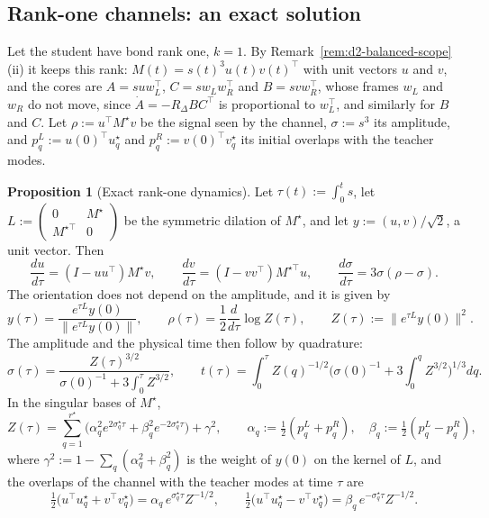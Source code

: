 \documentclass[11pt]{article}
\newcommand{\norm}[1]{\lVert #1\rVert}
\theoremstyle{definition}
\newtheorem{proposition}[theorem]{Proposition}
\numberwithin{equation}{section}
\begin{document}
\subsection{Rank-one channels: an exact solution}\label{sec:na-rank-one}

Let the student have bond rank one, $k=1$. By Remark~\ref{rem:d2-balanced-scope}(ii) it keeps this rank: $M(t)=s(t)^3u(t)v(t)^\top$ with unit vectors $u$ and $v$, and the cores are $A=suw_L^\top$, $C=sw_Lw_R^\top$ and $B=svw_R^\top$, whose frames $w_L$ and $w_R$ do not move, since $\dot A=-R_\Delta BC^\top$ is proportional to $w_L^\top$, and similarly for $B$ and $C$. Let $\rho:=u^\top M^\star v$ be the signal seen by the channel, $\sigma:=s^3$ its amplitude, and $p^L_q:=u(0)^\top u^\star_q$ and $p^R_q:=v(0)^\top v^\star_q$ its initial overlaps with the teacher modes.

\begin{proposition}[Exact rank-one dynamics]\label{prop:na-rank-one}
Let $\tau(t):=\int_0^ts$, let $L:=\begin{pmatrix}0&M^\star\\M^{\star\top}&0\end{pmatrix}$ be the symmetric dilation of $M^\star$, and let $y:=(u,v)/\sqrt2$, a unit vector. Then
\begin{equation}\label{eq:na-rank-one-flow}
\frac{du}{d\tau}=(I-uu^\top)M^\star v,\qquad\frac{dv}{d\tau}=(I-vv^\top)M^{\star\top}u,\qquad\frac{d\sigma}{d\tau}=3\sigma(\rho-\sigma).
\end{equation}
The orientation does not depend on the amplitude, and it is given by
\begin{equation}\label{eq:na-oja}
y(\tau)=\frac{e^{\tau L}y(0)}{\norm{e^{\tau L}y(0)}},\qquad\rho(\tau)=\frac12\frac{d}{d\tau}\log Z(\tau),\qquad Z(\tau):=\norm{e^{\tau L}y(0)}^2.
\end{equation}
The amplitude and the physical time then follow by quadrature:
\begin{equation}\label{eq:na-amplitude}
\sigma(\tau)=\frac{Z(\tau)^{3/2}}{\sigma(0)^{-1}+3\int_0^\tau Z^{3/2}},\qquad t(\tau)=\int_0^\tau Z(q)^{-1/2}\Big(\sigma(0)^{-1}+3\int_0^qZ^{3/2}\Big)^{1/3}dq.
\end{equation}
In the singular bases of $M^\star$,
\begin{equation}\label{eq:na-Z}
Z(\tau)=\sum_{q=1}^{r^\star}\big(\alpha_q^2e^{2\sigma^\star_q\tau}+\beta_q^2e^{-2\sigma^\star_q\tau}\big)+\gamma^2,\qquad\alpha_q:=\tfrac12(p^L_q+p^R_q),\quad\beta_q:=\tfrac12(p^L_q-p^R_q),
\end{equation}
where $\gamma^2:=1-\sum_q(\alpha_q^2+\beta_q^2)$ is the weight of $y(0)$ on the kernel of $L$, and the overlaps of the channel with the teacher modes at time $\tau$ are
\begin{equation}\label{eq:na-overlaps}
\tfrac12\big(u^\top u^\star_q+v^\top v^\star_q\big)=\alpha_q\,e^{\sigma^\star_q\tau}Z^{-1/2},\qquad\tfrac12\big(u^\top u^\star_q-v^\top v^\star_q\big)=\beta_q\,e^{-\sigma^\star_q\tau}Z^{-1/2}.
\end{equation}
\end{proposition}
\end{document}
